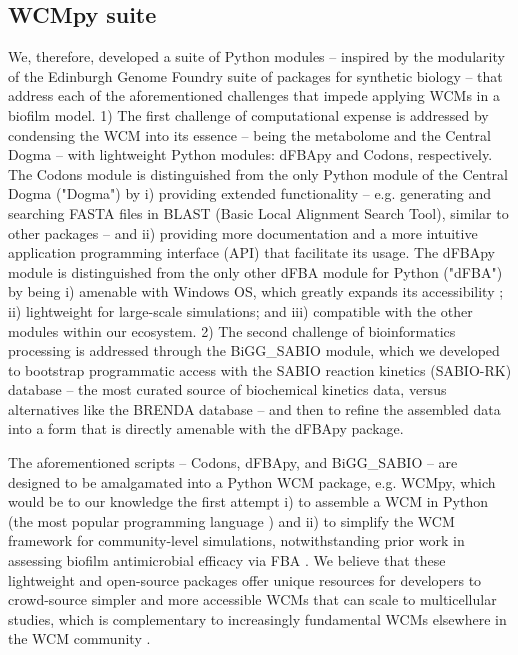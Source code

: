 \subsection{WCMpy suite}
We, therefore, developed a suite of Python modules -- inspired by the modularity of the Edinburgh Genome Foundry suite of packages \cite{Codons2021TheFoundry} for synthetic biology -- that address each of the aforementioned challenges that impede applying WCMs in a biofilm model. 1) The first challenge of computational expense is addressed by condensing the WCM into its essence -- being the metabolome and the Central Dogma -- with lightweight Python modules: dFBApy and Codons, respectively. The Codons module is distinguished from the only Python module of the Central Dogma ("Dogma") by i) providing extended functionality -- e.g. generating and searching FASTA files in BLAST (Basic Local Alignment Search Tool), similar to other packages \cite{Gilpin2016PyPDB:Bank} -- and ii) providing more documentation and a more intuitive application programming interface (API) that facilitate its usage. The dFBApy module is distinguished from the only other dFBA module for Python ("dFBA") by being i) amenable with Windows OS, which greatly expands its accessibility \cite{StatistaMarket2021}; ii) lightweight for large-scale simulations; and iii) compatible with the other modules within our ecosystem. 2) The second challenge of bioinformatics processing is addressed through the BiGG\_SABIO module, which we developed to bootstrap programmatic access with the SABIO reaction kinetics (SABIO-RK) database \cite{Wittig2012} -- the most curated source of biochemical kinetics data, versus alternatives like the BRENDA database \cite{Chang2021} -- and then to refine the assembled data into a form that is directly amenable with the dFBApy package. 

The aforementioned scripts -- Codons, dFBApy, and BiGG\_SABIO -- are designed to be amalgamated into a Python WCM package, e.g. WCMpy, which would be to our knowledge the first attempt i) to assemble a WCM in Python (the most popular programming language \cite{TIOBE2022}) and ii) to simplify the WCM framework for community-level simulations, notwithstanding prior work in assessing biofilm antimicrobial efficacy via FBA \cite{Sigurdsson2012ABiofilm}. We believe that these lightweight and open-source packages offer unique resources for developers to crowd-source simpler and more accessible WCMs that can scale to multicellular studies, which is complementary to increasingly fundamental WCMs \cite{Maritan2022BuildingCell} elsewhere in the WCM community \cite{Goldberg2018EmergingMethods,Shepelin2020BenchmarkingMetabolism}. 

